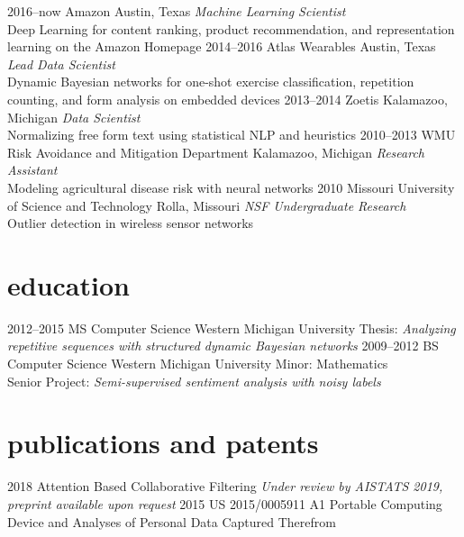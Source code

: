 \documentclass[print]{friggeri-cv}
\begin{document}
\begin{entrylist}
  \entry
    {2016--now}
    {Amazon}
    {Austin, Texas}
    {
      \emph{Machine Learning Scientist}\\
      Deep Learning for content ranking, product recommendation, and representation learning on the Amazon Homepage
    }
  \entry
    {2014--2016}
    {Atlas Wearables}
    {Austin, Texas}
    {
      \emph{Lead Data Scientist}\\
      Dynamic Bayesian networks for one-shot exercise classification, repetition counting, and form analysis on embedded devices
    }
  \entry
    {2013--2014}
    {Zoetis}
    {Kalamazoo, Michigan}
    {
      \emph{Data Scientist}\\
      Normalizing free form text using statistical NLP and heuristics
    }
  \entry
    {2010--2013}
    {WMU Risk Avoidance and Mitigation Department}
    {Kalamazoo, Michigan}
    {
      \emph{Research Assistant}\\
      Modeling agricultural disease risk with neural networks
    }
  \entry
    {2010}
    {Missouri University of Science and Technology}
    {Rolla, Missouri}
    {
      \emph{NSF Undergraduate Research}\\
      Outlier detection in wireless sensor networks
    }
\end{entrylist}

\section{education}

\begin{entrylist}
  \entry
    {2012--2015}
    {MS Computer Science}
    {Western Michigan University}
    {
      Thesis: \emph{Analyzing repetitive sequences with structured dynamic Bayesian networks}
    }
  \entry
    {2009--2012}
    {BS Computer Science}
    {Western Michigan University}
    {
      Minor: Mathematics\\
      Senior Project: \emph{Semi-supervised sentiment analysis with noisy labels}
    }
\end{entrylist}

\section{publications and patents}

\begin{entrylist}
  \entry
    {2018}
    {Attention Based Collaborative Filtering}
    {}
    {\emph{Under review by AISTATS 2019, preprint available upon request}}
  \entry
    {2015}
    {US 2015/0005911 A1}
    {}
    {Portable Computing Device and Analyses of Personal Data Captured Therefrom}
\end{entrylist}
\end{document}
